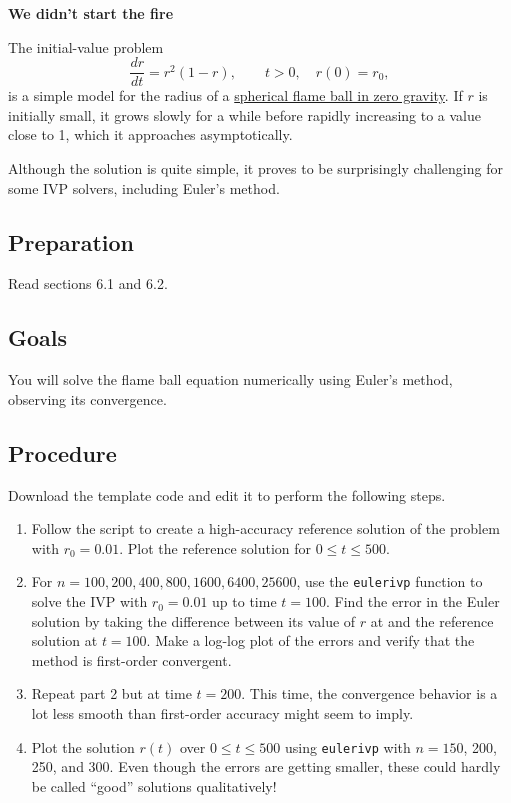\documentclass[11pt,twoside]{article}
\begin{document}
\begin{center}
  \bf We didn't start the fire
\end{center}

The initial-value problem
\begin{equation}
  \label{eq:fire}
  \frac{dr}{dt} = r^2(1-r), \qquad t > 0, \quad r(0)=r_0,
\end{equation}
is a simple model for the radius of a \href{https://youtu.be/Q58-la_yAB4}{spherical flame ball in zero gravity}. If $r$ is initially small, it grows slowly for a while before rapidly increasing to a value close to 1, which it approaches asymptotically. 

Although the solution is quite simple, it proves to be surprisingly challenging for some IVP solvers, including Euler's method.

\subsection*{Preparation}

Read sections 6.1 and 6.2. 

\subsection*{Goals}

You will solve the flame ball equation numerically using Euler's method, observing its convergence. 

\subsection*{Procedure}

Download the template code and edit it to perform the following steps. 

\begin{enumerate}
	\item Follow the script to create a high-accuracy reference solution of the problem with $r_0=0.01$. Plot the reference solution for $0\le t\le 500$. 
  \item For $n = 100,200,400,800,1600,6400,25600$, use the
    \texttt{eulerivp} function to solve the IVP with $r_0=0.01$ up to
    time $t=100$. Find the error in the Euler solution by taking the
    difference between its value of $r$ at
   and the reference solution at $t=100$. Make a log-log plot of the errors and verify that the method is first-order convergent.
  \item Repeat part 2 but at time $t=200$. This time, the convergence behavior is a lot less smooth than first-order accuracy might seem to imply.
  \item Plot the solution $r(t)$ over $0\le t \le 500$ using \texttt{eulerivp} with $n=150$, 200, 250, and 300. Even though the errors are getting smaller, these could hardly be called ``good'' solutions qualitatively!
\end{enumerate}
\end{document}
